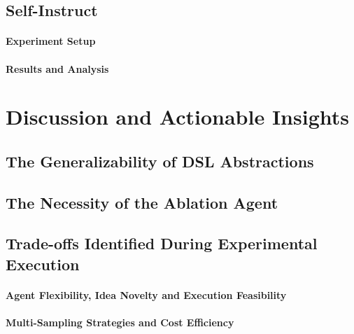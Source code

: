 \documentclass{article}
\begin{document}
\subsection{Self-Instruct} %

\paragraph{Experiment Setup}

\paragraph{Results and Analysis}

\section{Discussion and Actionable Insights}


\subsection{The Generalizability of DSL Abstractions}


\subsection{The Necessity of the Ablation Agent}


\subsection{Trade-offs Identified During Experimental Execution}


\paragraph{Agent Flexibility, Idea Novelty and Execution Feasibility}


\paragraph{Multi-Sampling Strategies and Cost Efficiency}
\end{document}

